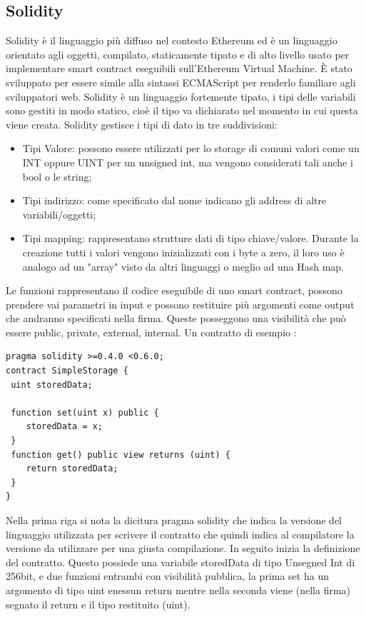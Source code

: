 \documentclass[12pt,titlepage]{report}
\begin{document}
\subsection{Solidity}
Solidity è il linguaggio più diffuso nel contesto Ethereum ed è un linguaggio orientato agli oggetti, compilato, staticamente tipato e di alto livello usato per implementare smart contract eseguibili sull’Ethereum Virtual Machine. È stato sviluppato per essere simile alla sintassi ECMAScript per renderlo familiare agli sviluppatori web. Solidity è un linguaggio fortemente tipato, i tipi delle variabili sono gestiti in modo statico, 
cioè il tipo va dichiarato nel momento in cui questa viene creata. Solidity gestisce i tipi di dato in tre suddivisioni:
\begin{itemize}
  \item Tipi Valore: possono essere utilizzati per lo storage di comuni valori come un INT oppure UINT per un unsigned int, ma vengono considerati tali anche i bool o le string;
  \item Tipi indirizzo: come specificato dal nome indicano gli address di altre variabili/oggetti;
  \item Tipi mapping: rappresentano strutture dati di tipo chiave/valore. Durante la creazione tutti i valori vengono inizializzati con i byte a zero, il loro uso è analogo ad un "array" visto da altri linguaggi o meglio ad una Hash map.
\end{itemize}
Le funzioni rappresentano il codice eseguibile di uno smart contract, possono prendere vai parametri in input e possono restituire più argomenti come output che andranno specificati nella firma. Queste posseggono una visibilità che può essere public, private, external, internal.
Un contratto di esempio :
\begin{lstlisting}[language=Solidity]
pragma solidity >=0.4.0 <0.6.0;
contract SimpleStorage {
 uint storedData;

 function set(uint x) public {
 	storedData = x;
 }
 function get() public view returns (uint) {
 	return storedData;
 }
}
\end{lstlisting}
Nella prima riga si nota la dicitura pragma solidity che indica la versione del linguaggio utilizzata per scrivere il contratto che quindi indica al compilatore la versione da utilizzare per una giusta compilazione. In seguito inizia la definizione del contratto. Questo possiede una variabile storedData di tipo Unsegned Int di 256bit, e due funzioni entrambi con visibilità pubblica, la prima set ha un argomento di tipo uint enessun return mentre nella seconda viene (nella firma) segnato il return e il tipo restituito (uint).
\end{document}
